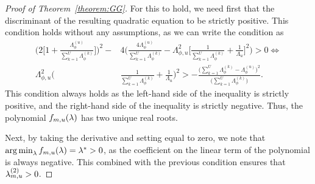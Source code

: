 \documentclass[12pt]{article}\usepackage[]{graphicx}\usepackage[]{xcolor}
\begin{document}
\begin{appendices}
\begin{proof}[Proof of Theorem~\ref{theorem:GG}]
For this to hold, we need first that the discriminant of the resulting quadratic equation to be strictly positive.
This condition holds without any assumptions, as we can write the condition as
\begin{align*}
\bigg(2\bigg[ 1 + \frac{\Lambda^{(u)}_{\phi}}{\sum_{k = 1}^U\Lambda^{(k)}_{\phi}}\bigg]\bigg)^2 - &4\bigg(\frac{4\Lambda^{(u)}_{\phi}}{\sum_{k = 1}^U\Lambda^{(k)}_{\phi}} - \Lambda_{\phi, u}^2\bigg[\frac{1}{\sum_{k = 1}^U\Lambda^{(k)}_{\phi}} + \frac{1}{\Lambda_u}\bigg]^2\bigg) > 0 \iff \\
\Lambda^{2}_{\phi, u}\bigg(&\frac{1}{\sum_{k = 1}^U \Lambda_{\phi}^{(k)}} + \frac{1}{\Lambda_u}\bigg)^2 > -\frac{\big(\sum_{k = 1}^U \Lambda_{\phi}^{(k)} - \Lambda_\phi^{(u)}\big)^2}{\big(\sum_{k = 1}^U \Lambda_{\phi}^{(k)}\big)}.
\end{align*}
This condition always holds as the left-hand side of the inequality is strictly positive, and the right-hand side of the inequality is strictly negative.
Thus, the polynomial $f_{m, u}(\lambda)$ has two unique real roots.

Next, by taking the derivative and setting equal to zero, we note that $\operatorname*{arg\,min}_\lambda f_{m, u}(\lambda) = \lambda^* > 0$, as the coefficient on the linear term of the polynomial is always negative.
This combined with the previous condition ensures that $\lambda^{(2)}_{m, u} > 0$.


\end{proof}
\end{appendices}
\end{document}
